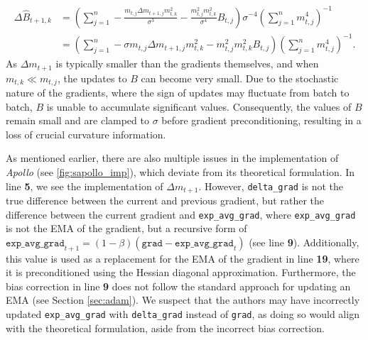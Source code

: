 \begin{align*}
    \Delta \hat{B}_{t+1,k} &= \left(\sum_{j=1}^{n} -\frac{m_{t,j} \Delta m_{t+1,j} m_{t,k}^2}{\sigma^3}  - \frac{m_{t,j}^2m_{t,k}^2}{\sigma^4} B_{t,j}  \right) \sigma^{-4} \left(\sum_{j=1}^{n} m_{t,j}^{4} \right)^{-1}\\
    &=  \left(\sum_{j=1}^{n} -\sigma m_{t,j} \Delta m_{t+1,j} m_{t,k}^2  - m_{t,j}^2m_{t,k}^2 B_{t,j} \right)  \left(\sum_{j=1}^{n} m_{t,j}^{4} \right)^{-1}.
\end{align*}
As $\Delta m_{t+1}$ is typically smaller than the gradients themselves, and when $m_{t,k} \ll m_{t,j}$, 
the updates to $B$ can become very small. Due to the stochastic nature of the gradients,
where the sign of updates may fluctuate from batch to batch, $B$ is unable to accumulate significant values.
Consequently, the values of $B$ remain small and are clamped to $\sigma$ before gradient preconditioning,
resulting in a loss of crucial curvature information.


As mentioned earlier, there are also multiple issues in the implementation of \emph{Apollo} (see \ref{fig:sapollo_imp}),
which deviate from its theoretical formulation. In line \textbf{5}, we see the implementation of $\Delta m_{t+1}$.
However, \texttt{delta\_grad} is not the true difference between the current and previous gradient,
but rather the difference between the current gradient and \texttt{exp\_avg\_grad}, where \texttt{exp\_avg\_grad}
is not the EMA of the gradient, but a recursive form of $\texttt{exp\_avg\_grad}_{t+1} = (1-\beta) (\texttt{grad} - \texttt{exp\_avg\_grad}_{t})$ (see line \textbf{9}).
Additionally, this value is used as a replacement for the EMA of the gradient in line \textbf{19},
where it is preconditioned using the Hessian diagonal approximation.
Furthermore, the bias correction in line \textbf{9} does not follow the standard approach for updating an EMA (see Section \ref{sec:adam}).
We suspect that the authors may have incorrectly updated \texttt{exp\_avg\_grad} with \texttt{delta\_grad} instead of \texttt{grad},
as doing so would align with the theoretical formulation, aside from the incorrect bias correction.

